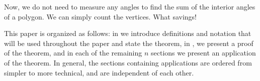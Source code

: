 Now, we do not need to measure any angles to find
the sum of  the interior angles of a polygon. We can simply
count the vertices. What savings!

This paper is organized as follows:
in  we introduce definitions and notation that will be used
throughout the paper and state the theorem,
in , we present a proof of the theorem, and in each of the remaining $n$
sections we present an application of the theorem.
In general, the sections containing applications are ordered from simpler to more technical,
and are independent of each other.


